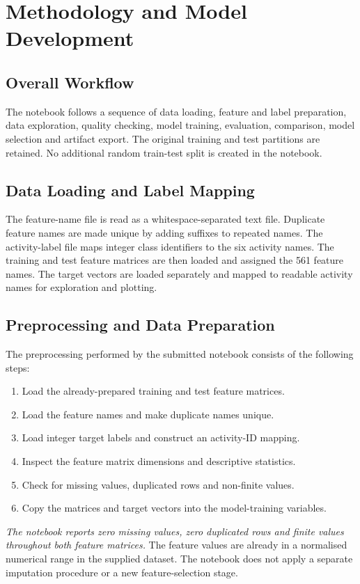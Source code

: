 \chapter{Methodology and Model Development}
\section{Overall Workflow}
The notebook follows a sequence of data loading, feature and label preparation, data exploration, quality checking, model training, evaluation, comparison, model selection and artifact export. The original training and test partitions are retained. No additional random train-test split is created in the notebook.

\section{Data Loading and Label Mapping}
The feature-name file is read as a whitespace-separated text file. Duplicate feature names are made unique by adding suffixes to repeated names. The activity-label file maps integer class identifiers to the six activity names. The training and test feature matrices are then loaded and assigned the 561 feature names. The target vectors are loaded separately and mapped to readable activity names for exploration and plotting.

\section{Preprocessing and Data Preparation}
The preprocessing performed by the submitted notebook consists of the following steps:
\begin{enumerate}
\item Load the already-prepared training and test feature matrices.
\item Load the feature names and make duplicate names unique.
\item Load integer target labels and construct an activity-ID mapping.
\item Inspect the feature matrix dimensions and descriptive statistics.
\item Check for missing values, duplicated rows and non-finite values.
\item Copy the matrices and target vectors into the model-training variables.
\end{enumerate}

\emph{The notebook reports zero missing values, zero duplicated rows and finite values throughout both feature matrices.} The feature values are already in a normalised numerical range in the supplied dataset. The notebook does not apply a separate imputation procedure or a new feature-selection stage.

